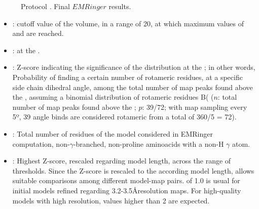 \begin{itemize}
\begin{itemize}
\begin{itemize}
\begin{figure}[H]
         \caption{Protocol . Final $EMRinger$ results.}
        \label{fig:app_protocol_emringer_4}
     \end{figure}
         \begin{itemize}
          \item {}:  cutoff value of the volume, in a range of 20, at which maximum values of  and  are reached. 
          \item {}:  at the .
          \item {}: Z-score indicating the significance of the distribution at the ; in other words, Probability of finding a certain number of rotameric residues, at a specific side chain dihedral angle, among the total number of map peaks found above the , assuming a binomial distribution of rotameric residues B( ($n$: total number of map peaks found above the ; $p$: 39/72; with map sampling every 5º, 39 angle binds are considered rotameric from a total of 360/5 = 72).
          \item {}: Total number of residues of the model considered in EMRinger computation, non-$\gamma$-branched, non-proline aminoacids with a non-H $\gamma$ atom.
          \item {}: Highest Z-score, rescaled regarding model length, across the range of  thresholds. Since the Z-score is rescaled to the  according model length,  allows suitable comparisons among different model-map pairs.  of 1.0 is usual for initial models refined regarding 3.2-3.5\AA resolution maps. For high-quality models with high resolution,  values higher than 2 are expected.
         \end{itemize}


\end{itemize}
\end{itemize}
\end{itemize}
